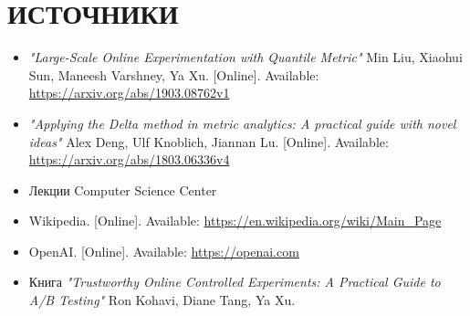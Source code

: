 \documentclass[specialist,
               substylefile = spbu_report.rtx,
               subf,href,colorlinks=true, 12pt]{disser}
\begin{document}
\section{ИСТОЧНИКИ}
\begin{itemize}
        \item \textit{"Large-Scale Online Experimentation with Quantile Metric"} Min Liu, Xiaohui Sun, Maneesh Varshney, Ya Xu. [Online]. Available: \url{https://arxiv.org/abs/1903.08762v1}
    
        \item \textit{"Applying the Delta method in metric analytics: A practical guide with novel ideas"} Alex Deng, Ulf Knoblich, Jiannan Lu. [Online]. Available: \url{https://arxiv.org/abs/1803.06336v4}
    
        \item Лекции Computer Science Center
    
        \item Wikipedia. [Online]. Available: \url{https://en.wikipedia.org/wiki/Main_Page}
    
        \item OpenAI. [Online]. Available: \url{https://openai.com}
    
        \item Книга \textit{"Trustworthy Online Controlled Experiments: A Practical Guide to A/B Testing"} Ron Kohavi, Diane Tang, Ya Xu.
\end{itemize}
        
\end{document}
